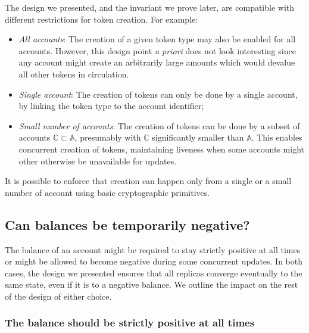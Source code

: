 \documentclass[9pt, oneside]{article}   	%
\begin{document}
The design we presented, and the invariant we prove later, are compatible with different restrictions for token creation. For example:
\begin{itemize}
	\item \textit{All accounts}: The creation of a given token type may also be enabled for all accounts. However, this design point \textit{a priori} does not look interesting since any account might create an arbitrarily large amounts which would devalue all other tokens in circulation.
	\item \textit{Single account}: The creation of tokens can only be done by a single account, by linking the token type to the account identifier;
	\item \textit{Small number of accounts}: The creation of tokens can be done by a subset of accounts $\mathds{C} \subset \mathds{A}$, presumably with $\mathds{C}$ significantly smaller than $\mathds{A}$. This enables concurrent creation of tokens, maintaining liveness when some accounts might other otherwise be unavailable for updates.
\end{itemize}

It is possible to enforce that creation can happen only from a single or a small number of account using basic cryptographic primitives.


\subsection{Can balances be temporarily negative?}
\label{sec:design-neg-balance-choice}

The balance of an account might be required to stay strictly positive at all times or might be allowed to become negative during some concurrent updates. In both cases, the design we presented ensures that all replicas converge eventually to the same state, even if it is to a negative balance. We outline the impact on the rest of the design of either choice.

\subsubsection{The balance should be strictly positive at all times}
\end{document}
